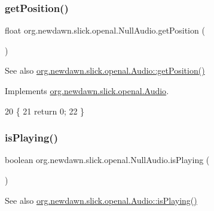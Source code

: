\subsubsection{\texorpdfstring{get\+Position()}{getPosition()}}
{\footnotesize\ttfamily float org.\+newdawn.\+slick.\+openal.\+Null\+Audio.\+get\+Position (\begin{DoxyParamCaption}{ }\end{DoxyParamCaption})\hspace{0.3cm}{\ttfamily [inline]}}

\begin{DoxySeeAlso}{See also}
\mbox{\hyperlink{interfaceorg_1_1newdawn_1_1slick_1_1openal_1_1_audio_aa838b5606c0aa5f23dd46ac5918bb717}{org.\+newdawn.\+slick.\+openal.\+Audio\+::get\+Position()}} 
\end{DoxySeeAlso}


Implements \mbox{\hyperlink{interfaceorg_1_1newdawn_1_1slick_1_1openal_1_1_audio_aa838b5606c0aa5f23dd46ac5918bb717}{org.\+newdawn.\+slick.\+openal.\+Audio}}.


\begin{DoxyCode}
20                                \{
21         \textcolor{keywordflow}{return} 0;
22     \}
\end{DoxyCode}
\mbox{\label{classorg_1_1newdawn_1_1slick_1_1openal_1_1_null_audio_a27365c7caedab2d146545ae5990a78c3}} 
\subsubsection{\texorpdfstring{is\+Playing()}{isPlaying()}}
{\footnotesize\ttfamily boolean org.\+newdawn.\+slick.\+openal.\+Null\+Audio.\+is\+Playing (\begin{DoxyParamCaption}{ }\end{DoxyParamCaption})\hspace{0.3cm}{\ttfamily [inline]}}

\begin{DoxySeeAlso}{See also}
\mbox{\hyperlink{interfaceorg_1_1newdawn_1_1slick_1_1openal_1_1_audio_a842b49128a58be8c4473cbcc8ee4ad9e}{org.\+newdawn.\+slick.\+openal.\+Audio\+::is\+Playing()}} 
\end{DoxySeeAlso}


